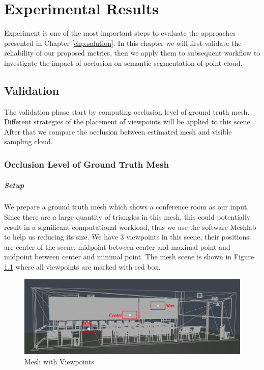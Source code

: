 \documentclass[11pt, a4paper,oneside,chapterprefix=false]{scrbook}
\begin{document}
\chapter{Experimental Results} \label{chp:experimental results}

Experiment is one of the most important steps to evaluate the approaches presented in Chapter \ref{chp:solution}. In this chapter we will first validate the reliability of our proposed metrics, then we apply them to subsequent workflow to investigate the impact of occlusion on semantic segmentation of point cloud.

\section{Validation}

The validation phase start by computing occlusion level of ground truth mesh. Different strategies of the placement of viewpoints will be applied to this scene. After that we compare the occlusion between estimated mesh and visible sampling cloud.

\subsection{Occlusion Level of Ground Truth Mesh} \label{exp:occlusion of ground truth mesh}

\paragraph{Setup}

We prepare a ground truth mesh which shows a conference room \cite{McGuire:17} as our input. Since there are a large quantity of triangles in this mesh, this could potentially result in a significant computational workload, thus we use the software Meshlab \cite{meshlab} to help us reducing its size. We have 3 viewpoints in this scene, their positions are center of the scene, midpoint between center and maximal point and midpoint between center and minimal point. The mesh scene is shown in Figure \ref{fig:mesh with viewpoints} where all viewpoints are marked with red box. 

\vspace{20pt}

\begin{figure}[H]
    \centering
    \includegraphics*[width=1.0\textwidth]{figures/mesh with vps.png}
    \caption{Mesh with Viewpoints}
    \label{fig:mesh with viewpoints}
\end{figure}
\end{document}
